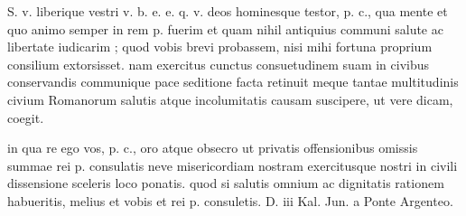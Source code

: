 


 S. v. liberique vestri v. b. e. e. q. v. deos hominesque testor, p. c., qua mente et quo animo semper in rem p. fuerim et quam nihil antiquius communi salute ac libertate iudicarim ; quod vobis brevi probassem, nisi mihi fortuna proprium consilium extorsisset. nam exercitus cunctus consuetudinem suam in civibus conservandis communique pace seditione facta retinuit meque tantae multitudinis civium Romanorum salutis atque incolumitatis causam suscipere, ut vere dicam, coegit.

 in qua re ego vos, p. c., oro atque obsecro ut privatis offensionibus omissis summae rei p. consulatis neve misericordiam nostram exercitusque nostri in civili dissensione sceleris loco ponatis. quod si salutis omnium ac dignitatis rationem habueritis, melius et vobis et rei p. consuletis. D. iii Kal. Jun. a Ponte Argenteo.
